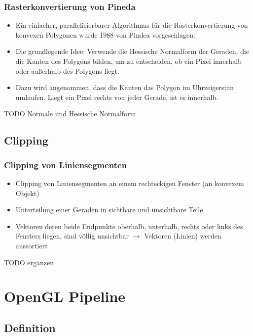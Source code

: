 \documentclass{scrartcl}
\begin{document}
\subsubsection{Rasterkonvertierung von Pineda}

\begin{itemize}
	\item Ein einfacher, parallelisierbarer Algorithmus für die Rasterkonvertierung von konvexen Polygonen wurde 1988 von Pindea vorgeschlagen.
	\item Die grundlegende Idee: Verwende die Hessische Normalform der Geraden, die die Kanten des Polygons bilden, um zu entscheiden, ob ein Pixel innerhalb oder außerhalb des Polygons liegt.
	\item Dazu wird angenommen, dass die Kanten das Polygon im Uhrzeigersinn umlaufen. Liegt ein Pixel rechts von jeder Gerade, ist es innerhalb.
\end{itemize}

TODO Normale und Hessische Normalform

\subsection{Clipping}

\subsubsection{Clipping von Liniensegmenten}

\begin{itemize}
	\item Clipping von Liniensegmenten an einem rechteckigen Fenster (an konvexem Objekt)
	\item Unterteilung einer Geraden in sichtbare und unsichtbare Teile
	\item Vektoren deren beide Endpunkte oberhalb, unterhalb, rechts oder links des Fensters liegen, sind völlig unsichtbar $\rightarrow$ Vektoren (Linien) werden aussortiert
\end{itemize}

TODO ergänzen

\section{OpenGL Pipeline}

\subsection{Definition}
\end{document}

